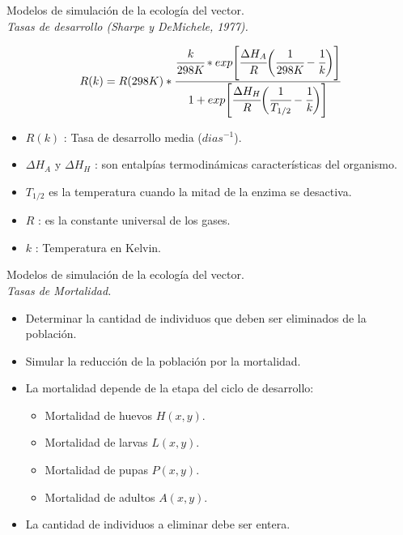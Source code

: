 \begin{frame}[t]{Modelos de simulación de la ecología del vector.\\\textit{Tasas de desarrollo
 (Sharpe y DeMichele, 1977).}}
  \begin{center}
      \begin{equation} \label{eq:schoolfield}
         R(k)  = R(298K) *\cfrac{ \cfrac{k}{298K} *
          exp \Bigg[
                  \cfrac{\Delta H_{A}}{R} \bigg(\cfrac{1}{298K} - \cfrac{1}{k}\bigg)
              \Bigg]}
          {1 + exp\Bigg[\cfrac{\Delta H_{H}}{R} \bigg(\cfrac{1}{T_{1/2}}- \cfrac{1}{k}\bigg)\Bigg] }
      \end{equation}
  \end{center}
   \begin{itemize}
      \item $R(k)$ : Tasa de desarrollo media ($dias^{-1}$).
      \item $\Delta H_{A}$ y $\Delta H_{H}$ : son entalpías termodinámicas características del organismo.
      \item $T_{1/2}$ es la temperatura cuando la mitad de la enzima se desactiva.
      \item $R$ : es la constante universal de los gases.
      \item $k$ : Temperatura en Kelvin.
    \end{itemize}
\end{frame}

\begin{frame}[c]{Modelos de simulación de la ecología del vector.\\\textit{Tasas de Mortalidad.}}
  \begin{itemize}
      \item Determinar la cantidad de individuos que deben ser eliminados de la población.
      \item Simular la reducción de la población por la mortalidad.
      \item La mortalidad depende de la etapa del ciclo de desarrollo:
      \begin{itemize}
		  \item Mortalidad de huevos $H(x, y)$.
		  \item Mortalidad de larvas $L(x,y)$.
		  \item Mortalidad de pupas $P(x,y)$.
		  \item Mortalidad de adultos $A(x,y)$.
      \end{itemize}
      \item La cantidad de individuos a eliminar debe ser entera.
  \end{itemize}
\end{frame}

